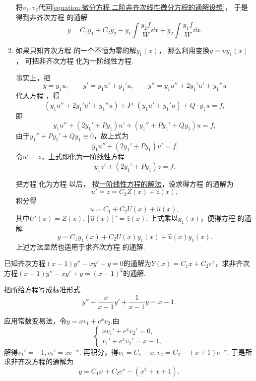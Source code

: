 \begin{enumerate}
将\(v_1,v_2\)代回\cref{equation:微分方程.二阶非齐次线性微分方程的通解设想}，
于是得到非齐次方程  的通解
\begin{equation}\label{equation:微分方程.二阶非齐次线性微分方程的通解.形式1}
y = C_1 y_1 + C_2 y_2
- y_1 \int \frac{y_2 f}{W} \dd{x}
+ y_2 \int \frac{y_1 f}{W} \dd{x}.
\end{equation}

\item%
如果只知齐次方程  的一个不恒为零的解\(y_1(x)\)，
那么利用变换\(y = u y_1(x)\)，
可把非齐次方程  化为一阶线性方程.

事实上，把\[
y = y_1 u, \qquad y' = y_1 u' + y_1' u, \qquad y'' = y_1 u'' + 2 y_1' u' + y_1'' u
\]代入方程 ，得\[
(y_1 u'' + 2y_1' u' + y_1'' u) + P\cdot(y_1 u' + y_1' u) + Q \cdot y_1 u = f,
\]即\[
y_1 u'' + (2y_1' + P y_1) u' + (y_1'' + P y_1' + Q y_1) u = f,
\]由于\(y_1'' + P y_1' + Q y_1 \equiv 0\)，故上式为\[
y_1 u'' + (2 y_1' + P y_1) u' = f.
\]令\(u' = z\)，上式即化为一阶线性方程
\begin{equation}\label{equation:微分方程.降为一阶的二阶线性微分方程}
y_1 z' + (2 y_1' + P y_1) z = f.
\end{equation}

把方程  化为方程  以后，
按\hyperref[section:微分方程.一阶线性微分方程]{一阶线性方程的解法}，设求得方程  的通解为\[
u' = z = C_2 Z(x) + \hat{z}(x),
\]积分得\[
u = C_1 + C_2 U(x) + \hat{u}(x),
\]其中\(U'(x) = Z(x), [\hat{u}(x)]' = \hat{z}(x)\).
上式乘以\(y_1(x)\)，便得方程  的通解
\begin{equation}\label{equation:微分方程.二阶非齐次线性微分方程的通解.形式2}
y = C_1 y_1(x) + C_2 U(x) y_1(x) + \hat{u}(x) y_1(x).
\end{equation}
上述方法显然也适用于求齐次方程  的通解.
\end{enumerate}

\begin{example}
已知齐次方程\((x-1)y'' - xy' + y = 0\)的通解为\(Y(x) = C_1 x + C_2 e^x\)，求非齐次方程\((x-1)y'' - xy' + y = (x-1)^2\)的通解.
\begin{solution}
把所给方程写成标准形式\[
y'' - \frac{x}{x-1} y' + \frac{1}{x-1} y = x-1.
\]

应用常数变易法，令\(y = x v_1 + e^x v_2\).由\[
\left\{ \begin{array}{l}
x v_1' + e^x v_2' = 0, \\
v_1' + e^x v_2' = x-1,
\end{array} \right.
\]解得\(v_1' = -1, v_2' = x e^{-x}\).
再积分，得\(v_1 = C_1 - x, v_2 = C_2 - (x+1) e^{-x}\).
于是所求非齐次方程的通解为\[
y = C_1 x + C_2 e^x - (x^2+x+1).
\]
\end{solution}
\end{example}

